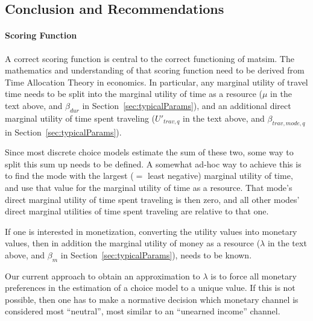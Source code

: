 
\subsection{Conclusion and Recommendations}

\paragraph*{Scoring Function}

A correct scoring function is central to the correct functioning of \acrshort{matsim}.
%
The mathematics and understanding of that scoring function need to be derived from Time Allocation Theory in economics.  In particular, any marginal utility of travel time needs to be split into the marginal utility of time as a resource ($\mu$ in the text above, and $\beta_{dur}$ in Section~\ref{sec:typicalParams}), and an additional direct marginal utility of time spent traveling ($U'_{trav,q}$ in the text above, and $\beta_{trav,mode,q}$ in Section~\ref{sec:typicalParams}).

Since most discrete choice models estimate the sum of these two, some way to split this sum up needs to be defined.  A somewhat ad-hoc way to achieve this is to find the mode with the largest ($=$ least negative) marginal utility of time, and use that value for the marginal utility of time as a resource.  That mode's direct marginal utility of time spent traveling is then zero, and all other modes' direct marginal utilities of time spent traveling are relative to that one.

If one is interested in monetization, \ie converting the utility values into monetary values, then in addition the marginal utility of money as a resource ($\lambda$ in the text above, and $\beta_m$ in Section~\ref{sec:typicalParams}), needs to be known. 

Our current approach to obtain an approximation to $\lambda$ is to force all monetary preferences in the estimation of a choice model to a unique value.  If this is not possible, then one has to make a normative decision which monetary channel is considered most ``neutral'', \ie most similar to an ``unearned income'' channel.

